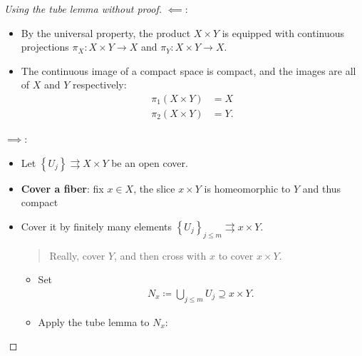 \begin{solution}

\envlist

\begin{proof}[Using the tube lemma without proof]

\(\impliedby\):

\begin{itemize}
\tightlist
\item
  By the universal property, the product \(X\times Y\) is equipped with
  continuous projections \(\pi_X: X\times Y\to X\) and
  \(\pi_Y: X\times Y\to X\).
\item
  The continuous image of a compact space is compact, and the images are
  all of \(X\) and \(Y\) respectively:
  \begin{align*}
  \pi_1(X\times Y) &= X \\
  \pi_2(X\times Y) &= Y
  .\end{align*}
\end{itemize}

\(\implies\):

\begin{itemize}
\item
  Let \(\left\{{U_j}\right\} \rightrightarrows X\times Y\) be an open
  cover.
\item
  \textbf{Cover a fiber}: fix \(x\in X\), the slice \(x \times Y\) is
  homeomorphic to \(Y\) and thus compact
\item
  Cover it by finitely many elements
  \(\left\{{U_j}\right\}_{j\leq m} \rightrightarrows{x} \times Y\).

  \begin{quote}
  Really, cover \(Y\), and then cross with \(x\) to cover
  \(x \times Y\).
  \end{quote}

  \begin{itemize}
  \tightlist
  \item
    Set
    \begin{align*}
    N_x \coloneqq\displaystyle\bigcup_{j\leq m} U_j \supseteq x \times Y
    .\end{align*}
  \item
    Apply the tube lemma to \(N_x\):


\end{itemize}
\end{itemize}
\end{proof}
\end{solution}
